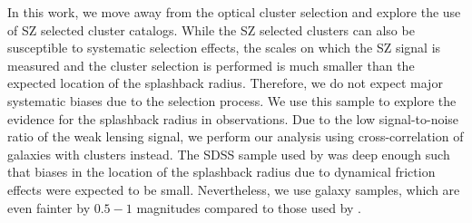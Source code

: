 \documentclass[iop, apjl, twocolappendix, numberedappendix]{emulateapj}
\begin{document}
In this work, we move away from the optical cluster selection and
explore the use of SZ selected cluster catalogs. While the SZ
selected clusters can also be susceptible to systematic selection
effects, the scales on which the SZ signal is measured and the
cluster selection is performed is much smaller than the expected
location of the splashback radius. Therefore, we do not expect major
systematic biases due to the selection process. We use this sample
to explore the evidence for the splashback radius in observations.
Due to the low signal-to-noise ratio of the weak lensing signal, we
perform our analysis using cross-correlation of galaxies with
clusters instead. The SDSS sample used by \citet{more2016detection}
was deep enough such that biases in the location of the splashback
radius due to dynamical friction effects were expected to be small.
Nevertheless, we use galaxy samples, which are even fainter by
$0.5-1$ magnitudes compared to those used by
\citet{more2016detection}.
\end{document}

